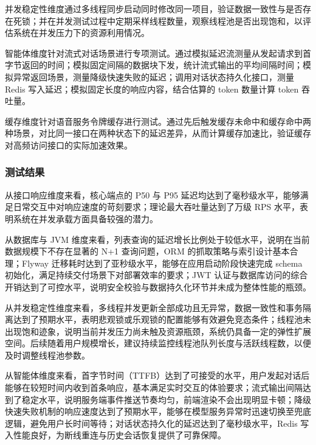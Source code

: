 \par 并发稳定性维度通过多线程同步启动同时修改同一项目，验证数据一致性与是否存在死锁；并在并发测试过程中定期采样线程数量，观察线程池是否出现饱和，以评估系统在并发压力下的资源利用情况。

\par 智能体维度针对流式对话场景进行专项测试。通过模拟延迟流测量从发起请求到首字节返回的时间；模拟固定间隔的数据块下发，统计流式输出的平均间隔时间；模拟异常返回场景，测量降级快速失败的延迟；调用对话状态持久化接口，测量 Redis 写入延迟；模拟固定长度的响应内容，结合估算的 token 数量计算 token 吞吐量。

\par 缓存维度针对语音服务令牌缓存进行测试。通过先后触发缓存未命中和缓存命中两种场景，对比同一接口在两种状态下的延迟差异，从而计算缓存加速比，验证缓存对高频访问接口的实际加速效果。

\subsubsection{测试结果}

\par 从接口响应维度来看，核心端点的 P50 与 P95 延迟均达到了毫秒级水平，能够满足日常交互中对响应速度的苛刻要求；理论最大吞吐量达到了万级 RPS 水平，表明系统在并发承载方面具备较强的潜力。

\par 从数据库与 JVM 维度来看，列表查询的延迟增长比例处于较低水平，说明在当前数据规模下不存在显著的 N+1 查询问题，ORM 的抓取策略与索引设计基本合理；Flyway 迁移耗时达到了亚秒级水平，能够在应用启动阶段快速完成 schema 初始化，满足持续交付场景下对部署效率的要求；JWT 认证与数据库访问的综合开销达到了可控水平，说明安全校验与数据持久化环节并未成为整体性能的瓶颈。

\par 从并发稳定性维度来看，多线程并发更新全部成功且无异常，数据一致性和事务隔离达到了预期水平，表明悲观锁或乐观锁的配置能够有效避免竞态条件；线程池未出现饱和迹象，说明当前并发压力尚未触及资源瓶颈，系统仍具备一定的弹性扩展空间。后续随着用户规模增长，建议持续监控线程池队列长度与活跃线程数，以便及时调整线程池参数。

\par 从智能体维度来看，首字节时间（TTFB）达到了可接受的水平，用户发起对话后能够在较短时间内收到首条响应，基本满足实时交互的体验要求；流式输出间隔达到了稳定水平，说明服务端事件推送节奏均匀，前端渲染不会出现明显卡顿；降级快速失败机制的响应速度达到了预期水平，能够在模型服务异常时迅速切换至兜底逻辑，避免用户长时间等待；对话状态持久化的延迟达到了毫秒级水平，Redis 写入性能良好，为断线重连与历史会话恢复提供了可靠保障。

